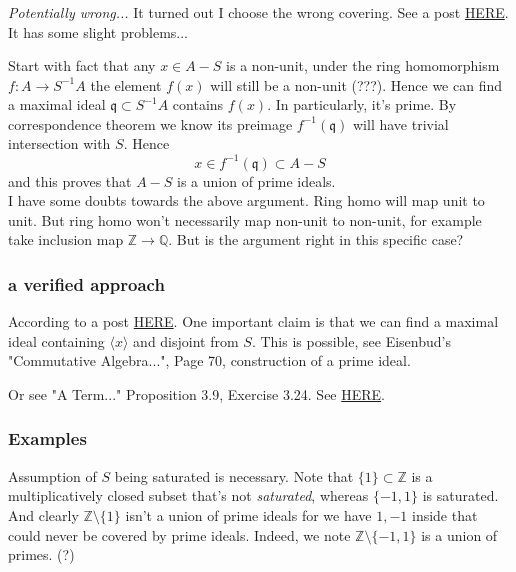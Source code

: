 \subsubsection{}
\textit{Potentially wrong...}
It turned out I choose the wrong covering. See a post \href{https://math.stackexchange.com/questions/3988316/proof-verification-atiyah-macdonald-exercise-3-7i}{HERE}. It has some slight problems...

Start with fact that any $x\in A-S$ is a non-unit, under the ring homomorphism $f:A\to S^{-1}A$ the element $f(x)$ will still be a non-unit (???). Hence we can find a maximal ideal $\mathfrak q\subset S^{-1}A$ contains $f(x)$. In particularly, it's prime. By correspondence theorem we know its preimage $f^{-1}(\mathfrak q)$ will have trivial intersection with $S$. Hence 
$$x\in f^{-1}(\mathfrak q)\subset A-S$$ and this proves that $A-S$ is a union of prime ideals.\\

I have some doubts towards the above argument. Ring homo will map unit to unit. But ring homo won't necessarily map non-unit to non-unit, for example take inclusion map $\mathbb Z\to \mathbb Q$. 
But is the argument right in this specific case?

\subsubsection{a verified approach}

According to a post \href{https://math.stackexchange.com/questions/57684/complement-of-saturated-set}{HERE}. One important claim is that we can find a maximal ideal containing $\langle x\rangle$ and disjoint from $S$. This is possible, see Eisenbud's "Commutative Algebra...", Page 70, construction of a prime ideal.

Or see "A Term..." Proposition 3.9, Exercise 3.24. See \href{https://math.stackexchange.com/questions/4329999/saturated-set-and-union-of-prime-ideals}{HERE}. 

\subsubsection{Examples}

Assumption of $S$ being saturated is necessary. Note that $\{1\}\subset \mathbb Z$ is a multiplicatively closed subset that's not \textit{saturated}, whereas $\{-1,1\}$ is saturated. And clearly $\mathbb Z\setminus \{1\}$ isn't a union of prime ideals for we have $1,-1$ inside that could never be covered by prime ideals. Indeed, we note $\mathbb Z\setminus \{-1,1\}$ is a union of primes. (?) 


